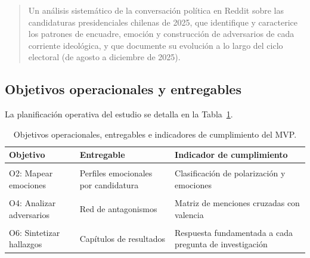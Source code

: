 \documentclass[
  letterpaper,
  numbers=noendperiod,
  fontsize=11pt,
  DIV=12,
  titlepage=false]{scrreprt}
\begin{document}
\begin{quote}
Un análisis sistemático de la conversación política en Reddit sobre las
candidaturas presidenciales chilenas de 2025, que identifique y
caracterice los patrones de encuadre, emoción y construcción de
adversarios de cada corriente ideológica, y que documente su evolución a
lo largo del ciclo electoral (de agosto a diciembre de 2025).
\end{quote}

\subsection{Objetivos operacionales y
entregables}\label{objetivos-operacionales-y-entregables}

La planificación operativa del estudio se detalla en la
Tabla~\ref{tbl-objetivos-mvp}.

\newpage

\begin{longtable}[t]{>{\raggedright\arraybackslash}p{4.2cm}>{\raggedright\arraybackslash}p{4.2cm}>{\raggedright\arraybackslash}p{6.5cm}}

\caption{\label{tbl-objetivos-mvp}Objetivos operacionales, entregables e
indicadores de cumplimiento del MVP.}

\tabularnewline

\toprule
Objetivo & Entregable & Indicador de cumplimiento\\
\midrule
\cellcolor{gray!10}{O1: Construir corpus} & \cellcolor{gray!10}{Base de datos estructurada} & \cellcolor{gray!10}{>= 1000 posts y >= 10.000 comentarios con menciones políticas}\\
O2: Mapear emociones & Perfiles emocionales por candidatura & Clasificación de polarización y emociones\\
\cellcolor{gray!10}{O3: Analizar encuadres} & \cellcolor{gray!10}{Distribución de marcos por corriente} & \cellcolor{gray!10}{Comparación de frames entre candidaturas y fases electorales}\\
O4: Analizar adversarios & Red de antagonismos & Matriz de menciones cruzadas con valencia\\
\cellcolor{gray!10}{O5: Documentar evolución} & \cellcolor{gray!10}{Serie temporal} & \cellcolor{gray!10}{Análisis por fase electoral (precampaña, campaña, segunda vuelta)}\\
\addlinespace
O6: Sintetizar hallazgos & Capítulos de resultados & Respuesta fundamentada a cada pregunta de investigación\\
\bottomrule

\end{longtable}
\end{document}
